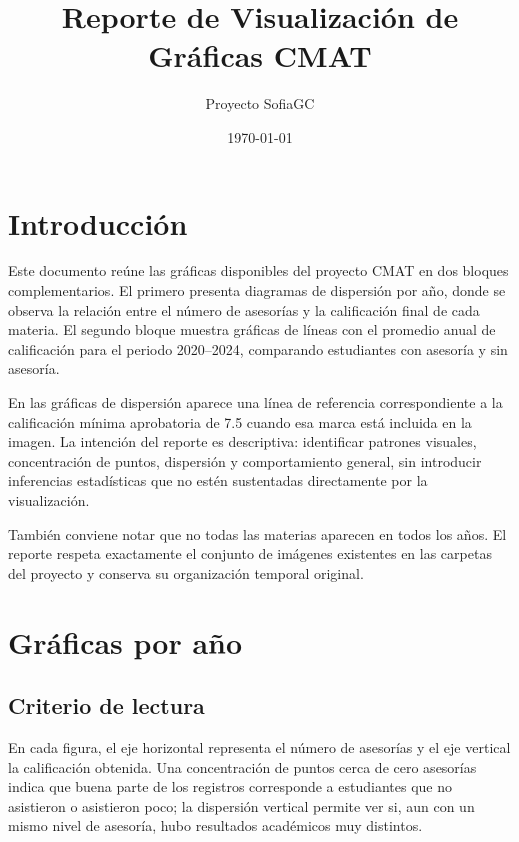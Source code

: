 \documentclass[12pt]{article}
\title{Reporte de Visualización de Gráficas CMAT}
\author{Proyecto SofiaGC}
\date{\today}
\begin{document}
\maketitle
\tableofcontents
\newpage

\section{Introducción}
Este documento reúne las gráficas disponibles del proyecto CMAT en dos bloques complementarios. El primero presenta diagramas de dispersión por año, donde se observa la relación entre el número de asesorías y la calificación final de cada materia. El segundo bloque muestra gráficas de líneas con el promedio anual de calificación para el periodo 2020--2024, comparando estudiantes con asesoría y sin asesoría.

En las gráficas de dispersión aparece una línea de referencia correspondiente a la calificación mínima aprobatoria de 7.5 cuando esa marca está incluida en la imagen. La intención del reporte es descriptiva: identificar patrones visuales, concentración de puntos, dispersión y comportamiento general, sin introducir inferencias estadísticas que no estén sustentadas directamente por la visualización.

También conviene notar que no todas las materias aparecen en todos los años. El reporte respeta exactamente el conjunto de imágenes existentes en las carpetas del proyecto y conserva su organización temporal original.

\section{Gráficas por año}

\subsection*{Criterio de lectura}
En cada figura, el eje horizontal representa el número de asesorías y el eje vertical la calificación obtenida. Una concentración de puntos cerca de cero asesorías indica que buena parte de los registros corresponde a estudiantes que no asistieron o asistieron poco; la dispersión vertical permite ver si, aun con un mismo nivel de asesoría, hubo resultados académicos muy distintos.
\end{document}
